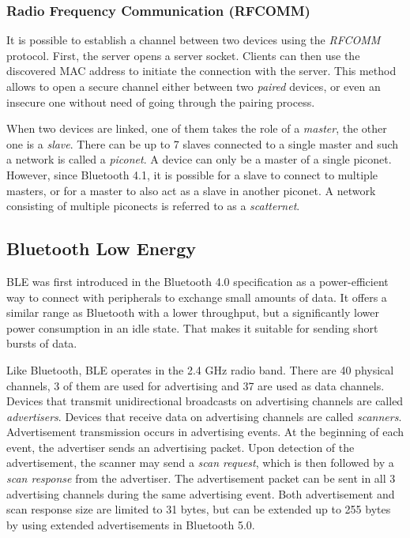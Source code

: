 \documentclass[conference,compsoc]{IEEEtran}
\begin{document}
\subsubsection{Radio Frequency Communication (RFCOMM)}
It is possible to establish a channel between two devices using the \textit{RFCOMM} protocol. First, the server opens a server socket. Clients can then use the discovered MAC address to initiate the connection with the server. This method allows to open a secure channel either between two \textit{paired} devices, or even an insecure one without need of going through the pairing process.

When two devices are linked, one of them takes the role of a \textit{master}, the other one is a \textit{slave}. There can be up to 7 slaves connected to a single master and such a network is called a \textit{piconet}. A device can only be a master of a single piconet. However, since Bluetooth 4.1, it is possible for a slave to connect to multiple masters, or for a master to also act as a slave in another piconet. A network consisting of multiple piconects is referred to as a \textit{scatternet}. \cite{bluetooth51spec}

\subsection{Bluetooth Low Energy}
BLE was first introduced in the Bluetooth 4.0 specification as a power-efficient way to connect with peripherals to exchange small amounts of data. It offers a similar range as Bluetooth with a lower throughput, but a significantly lower power consumption in an idle state. That makes it suitable for sending short bursts of data.

Like Bluetooth, BLE operates in the 2.4 GHz radio band. There are 40 physical channels, 3 of them are used for advertising and 37 are used as data channels. Devices that transmit unidirectional broadcasts on advertising channels are called \textit{advertisers}. Devices that receive data on advertising channels are called \textit{scanners}. Advertisement transmission occurs in advertising events. At the beginning of each event, the advertiser sends an advertising packet. Upon detection of the advertisement, the scanner may send a \textit{scan request}, which is then followed by a \textit{scan response} from the advertiser. The advertisement packet can be sent in all 3 advertising channels during the same advertising event. Both advertisement and scan response size are limited to 31 bytes, but can be extended up to 255 bytes by using extended advertisements in Bluetooth 5.0. \cite{bluetooth51spec}
\end{document}
